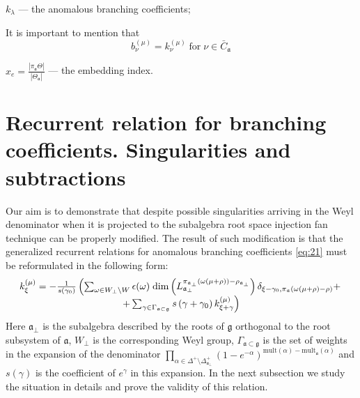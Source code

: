 \documentclass[a4paper,12pt]{article}
\theoremstyle{definition} \newtheorem{Def}{Definition}
\begin{document}
 $k_{\lambda}$ --- the anomalous branching coefficients;

It is important to mention that
\begin{equation}
  \label{eq:20}
  b^{(\mu)}_{\nu}=k^{(\mu)}_{\nu} \; \mbox{for} \; \nu\in \bar{C}_{\mathfrak{a}}
\end{equation}

$x_e=\frac{\left|\pi_{\mathfrak{a}} \Theta\right|}{\left|\Theta_{\mathfrak{a}}\right|}$ --- the embedding index.

\section{Recurrent relation for branching coefficients. Singularities and subtractions}
\label{sec:recurr-form-branch}

Our aim is to demonstrate that despite possible singularities arriving in the Weyl denominator
when it is projected to the subalgebra root space injection fan technique can be properly modified.
The result of such modification is that the generalized recurrent relations for anomalous branching
coefficients \eqref{eq:21} must be reformulated in the following form:
\begin{equation}
  \label{eq:1}
  \begin{array}{c}
      k_{\xi }^{\left( \mu \right) }=-\frac{1}{s\left( \gamma _{0}\right) }\left(
  \sum_{\omega\in W_{\bot}\backslash W} \epsilon(\omega)\; {\rm dim}\left(L^{\pi_{\mathfrak{a}_{\bot}}(\omega(\mu+\rho))-\rho_{\mathfrak{a}_{\bot}}}_{\mathfrak{a}_{\bot}}\right) \delta_{\xi-\gamma_0,\pi_{\mathfrak{a}}(\omega(\mu+\rho)-\rho)}+ \right.\\
\left.
+\sum_{\gamma \in
\Gamma _{\frak{a}\subset \frak{g}}}s\left( \gamma +\gamma _{0}\right) k_{\xi
+\gamma }^{\left( \mu \right) }\right)
  \end{array}
   \end{equation}
Here $\mathfrak{a}_{\bot}$ is the subalgebra described by the roots of $\mathfrak{g}$
orthogonal to the root subsystem of $\mathfrak{a}$, $W_{\bot}$ is the corresponding Weyl group,
$\Gamma_{\mathfrak{a}\subset \mathfrak{g}}$ is the set of weights in the expansion
of the denominator $\prod_{\alpha\in \Delta^{+}\setminus \Delta^{+}_{\mathfrak{a}_{\bot}}}
(1-e^{-\alpha})^{\mathrm{mult}(\alpha)-\mathrm{mult}_{\mathfrak{a}}(\alpha)}$ and $s(\gamma)$
is the coefficient of $e^{\gamma}$ in this expansion.
In the next subsection we study the situation in details and prove the validity of this relation.
\end{document}

